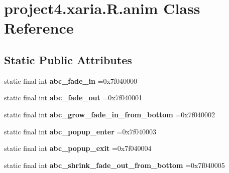 \hypertarget{classproject4_1_1xaria_1_1R_1_1anim}{}\section{project4.\+xaria.\+R.\+anim Class Reference}
\label{classproject4_1_1xaria_1_1R_1_1anim}
\subsection*{Static Public Attributes}
\begin{DoxyCompactItemize}
\item 
\mbox{\label{classproject4_1_1xaria_1_1R_1_1anim_aefc035034d11e5647f9e6e15137f9bd5}} 
static final int {\bfseries abc\+\_\+fade\+\_\+in} =0x7f040000
\item 
\mbox{\label{classproject4_1_1xaria_1_1R_1_1anim_a963c1f759dcb1df55dadba2e8a51bf09}} 
static final int {\bfseries abc\+\_\+fade\+\_\+out} =0x7f040001
\item 
\mbox{\label{classproject4_1_1xaria_1_1R_1_1anim_a52d574044bd9fe410e98549f4eb2325d}} 
static final int {\bfseries abc\+\_\+grow\+\_\+fade\+\_\+in\+\_\+from\+\_\+bottom} =0x7f040002
\item 
\mbox{\label{classproject4_1_1xaria_1_1R_1_1anim_a12468cee41d8b7b31a6ee7635e557ca8}} 
static final int {\bfseries abc\+\_\+popup\+\_\+enter} =0x7f040003
\item 
\mbox{\label{classproject4_1_1xaria_1_1R_1_1anim_acc13b1e5edc65fe5664fee397e49caec}} 
static final int {\bfseries abc\+\_\+popup\+\_\+exit} =0x7f040004
\item 
\mbox{\label{classproject4_1_1xaria_1_1R_1_1anim_a2e2fc25e7612c8ecb9692e1d97dfb49b}} 
static final int {\bfseries abc\+\_\+shrink\+\_\+fade\+\_\+out\+\_\+from\+\_\+bottom} =0x7f040005
\item 
\mbox{\label{classproject4_1_1xaria_1_1R_1_1anim_af433b3982b6449810836d1df01d74b0b}} 

\end{DoxyCompactItemize}

